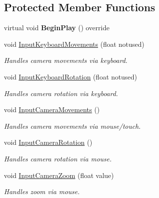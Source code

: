 \subsection*{Protected Member Functions}
\begin{DoxyCompactItemize}
\item 
\mbox{\label{class_a_t_t___player_grid_camera_acce40996cf41c4cf2fb31d7ddd158abc}} 
virtual void {\bfseries Begin\+Play} () override
\item 
void \mbox{\hyperlink{class_a_t_t___player_grid_camera_add3a8f7a775aed1d2943843f2a53e7cd}{Input\+Keyboard\+Movements}} (float notused)
\begin{DoxyCompactList}\small\item\em Handles camera movements via keyboard. \end{DoxyCompactList}\item 
void \mbox{\hyperlink{class_a_t_t___player_grid_camera_aec7ff1bb18a7904e3a6d3e13253eae48}{Input\+Keyboard\+Rotation}} (float notused)
\begin{DoxyCompactList}\small\item\em Handles camera rotation via keyboard. \end{DoxyCompactList}\item 
void \mbox{\hyperlink{class_a_t_t___player_grid_camera_a8c3523ed3ca9e59d65d7aab20a51a4f3}{Input\+Camera\+Movements}} ()
\begin{DoxyCompactList}\small\item\em Handles camera movements via mouse/touch. \end{DoxyCompactList}\item 
void \mbox{\hyperlink{class_a_t_t___player_grid_camera_aaf74425253dc40b18874f7e9be347887}{Input\+Camera\+Rotation}} ()
\begin{DoxyCompactList}\small\item\em Handles camera rotation via mouse. \end{DoxyCompactList}\item 
void \mbox{\hyperlink{class_a_t_t___player_grid_camera_a4b97741b890a94e22076932e9d28d311}{Input\+Camera\+Zoom}} (float value)
\begin{DoxyCompactList}\small\item\em Handles zoom via mouse. \end{DoxyCompactList}\item 
\mbox{\label{class_a_t_t___player_grid_camera_aa393b50d508c21a1dd8faae484d96407}} 

\end{DoxyCompactItemize}
